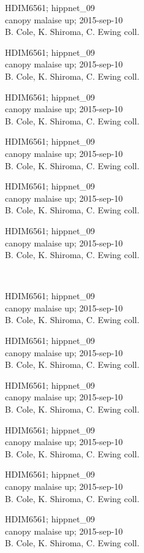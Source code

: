 \documentclass[2pt]{extarticle}
\begin{document}
\noindent
\parbox{0.16\textwidth}{\tiny \raggedright \rule[-0.3\baselineskip]{0pt}{10pt}HDIM6561; hippnet\_09\\ canopy malaise up; 2015-sep-10\\ B. Cole, K. Shiroma, C. Ewing coll.}
\parbox{0.16\textwidth}{\tiny \raggedright \rule[-0.3\baselineskip]{0pt}{10pt}HDIM6561; hippnet\_09\\ canopy malaise up; 2015-sep-10\\ B. Cole, K. Shiroma, C. Ewing coll.}
\parbox{0.16\textwidth}{\tiny \raggedright \rule[-0.3\baselineskip]{0pt}{10pt}HDIM6561; hippnet\_09\\ canopy malaise up; 2015-sep-10\\ B. Cole, K. Shiroma, C. Ewing coll.}
\parbox{0.16\textwidth}{\tiny \raggedright \rule[-0.3\baselineskip]{0pt}{10pt}HDIM6561; hippnet\_09\\ canopy malaise up; 2015-sep-10\\ B. Cole, K. Shiroma, C. Ewing coll.}
\parbox{0.16\textwidth}{\tiny \raggedright \rule[-0.3\baselineskip]{0pt}{10pt}HDIM6561; hippnet\_09\\ canopy malaise up; 2015-sep-10\\ B. Cole, K. Shiroma, C. Ewing coll.}
\parbox{0.16\textwidth}{\tiny \raggedright \rule[-0.3\baselineskip]{0pt}{10pt}HDIM6561; hippnet\_09\\ canopy malaise up; 2015-sep-10\\ B. Cole, K. Shiroma, C. Ewing coll.} \\ 
\vspace{0.001in} 

\noindent
\parbox{0.16\textwidth}{\tiny \raggedright \rule[-0.3\baselineskip]{0pt}{10pt}HDIM6561; hippnet\_09\\ canopy malaise up; 2015-sep-10\\ B. Cole, K. Shiroma, C. Ewing coll.}
\parbox{0.16\textwidth}{\tiny \raggedright \rule[-0.3\baselineskip]{0pt}{10pt}HDIM6561; hippnet\_09\\ canopy malaise up; 2015-sep-10\\ B. Cole, K. Shiroma, C. Ewing coll.}
\parbox{0.16\textwidth}{\tiny \raggedright \rule[-0.3\baselineskip]{0pt}{10pt}HDIM6561; hippnet\_09\\ canopy malaise up; 2015-sep-10\\ B. Cole, K. Shiroma, C. Ewing coll.}
\parbox{0.16\textwidth}{\tiny \raggedright \rule[-0.3\baselineskip]{0pt}{10pt}HDIM6561; hippnet\_09\\ canopy malaise up; 2015-sep-10\\ B. Cole, K. Shiroma, C. Ewing coll.}
\parbox{0.16\textwidth}{\tiny \raggedright \rule[-0.3\baselineskip]{0pt}{10pt}HDIM6561; hippnet\_09\\ canopy malaise up; 2015-sep-10\\ B. Cole, K. Shiroma, C. Ewing coll.}
\parbox{0.16\textwidth}{\tiny \raggedright \rule[-0.3\baselineskip]{0pt}{10pt}HDIM6561; hippnet\_09\\ canopy malaise up; 2015-sep-10\\ B. Cole, K. Shiroma, C. Ewing coll.} \\ 
\vspace{0.001in} 
\end{document}
